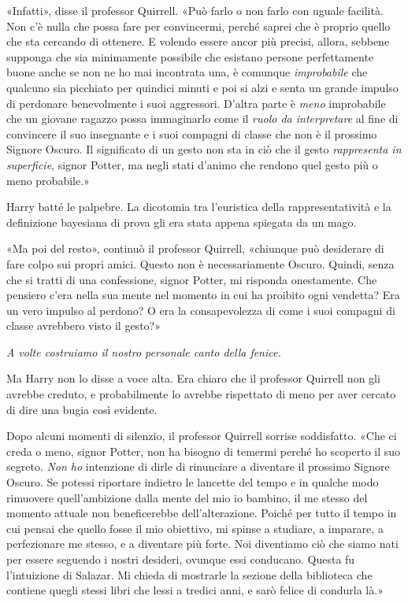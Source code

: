 «Infatti», disse il professor Quirrell. «Può farlo o non farlo con uguale facilità. Non c’è nulla che possa fare per convincermi, perché saprei che è proprio quello che sta cercando di ottenere. E volendo essere ancor più precisi, allora, sebbene supponga che sia minimamente possibile che esistano persone perfettamente buone anche se non ne ho mai incontrata una, è comunque \textit{improbabile} che qualcuno sia picchiato per quindici minuti e poi si alzi e senta un grande impulso di perdonare benevolmente i suoi aggressori. D’altra parte è \textit{meno} improbabile che un giovane ragazzo possa immaginarlo come il \textit{ruolo da interpretare} al fine di convincere il suo insegnante e i suoi compagni di classe che non è il prossimo Signore Oscuro. Il significato di un gesto non sta in ciò che il gesto \textit{rappresenta in superficie}, signor Potter, ma negli stati d’animo che rendono quel gesto più o meno probabile.»

Harry batté le palpebre. La dicotomia tra l’euristica della rappresentatività e la definizione bayesiana di prova gli era stata appena spiegata da un mago.

«Ma poi del resto», continuò il professor Quirrell, «chiunque può desiderare di fare colpo sui propri amici. Questo non è necessariamente Oscuro. Quindi, senza che si tratti di una confessione, signor Potter, mi risponda onestamente. Che pensiero c’era nella sua mente nel momento in cui ha proibito ogni vendetta? Era un vero impulso al perdono? O era la consapevolezza di come i suoi compagni di classe avrebbero visto il gesto?»

\textit{A volte costruiamo il nostro personale canto della fenice.}

Ma Harry non lo disse a voce alta. Era chiaro che il professor Quirrell non gli avrebbe creduto, e probabilmente lo avrebbe rispettato di meno per aver cercato di dire una bugia così evidente.

Dopo alcuni momenti di silenzio, il professor Quirrell sorrise soddisfatto. «Che ci creda o meno, signor Potter, non ha bisogno di temermi perché ho scoperto il suo segreto. \textit{Non ho} intenzione di dirle di rinunciare a diventare il prossimo Signore Oscuro. Se potessi riportare indietro le lancette del tempo e in qualche modo rimuovere quell’ambizione dalla mente del mio io bambino, il me stesso del momento attuale non beneficerebbe dell’alterazione. Poiché per tutto il tempo in cui pensai che quello fosse il mio obiettivo, mi spinse a studiare, a imparare, a perfezionare me stesso, e a diventare più forte. Noi diventiamo ciò che siamo nati per essere seguendo i nostri desideri, ovunque essi conducano. Questa fu l’intuizione di Salazar. Mi chieda di mostrarle la sezione della biblioteca che contiene quegli stessi libri che lessi a tredici anni, e sarò felice di condurla là.»


